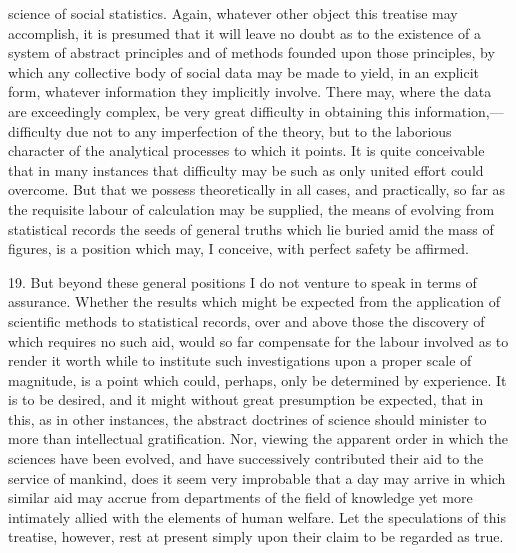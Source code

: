 \documentclass[oneside]{book}
\begin{document}
science of social statistics. Again, whatever other object this
treatise may accomplish, it is presumed that it will leave no
doubt as to the existence of a system of abstract principles and of
methods founded upon those principles, by which any collective
body of social data may be made to yield, in an explicit form,
whatever information they implicitly involve. There may, where
the data are exceedingly complex, be very great difficulty in obtaining
this information,---difficulty due not to any imperfection
of the theory, but to the laborious character of the analytical
processes to which it points. It is quite conceivable that in many
instances that difficulty may be such as only united effort could
overcome. But that we possess theoretically in all cases, and
practically, so far as the requisite labour of calculation may be
supplied, the means of evolving from statistical records the seeds
of general truths which lie buried amid the mass of figures, is a
position which may, I conceive, with perfect safety be affirmed.

19. But beyond these general positions I do not venture to
speak in terms of assurance. Whether the results which might
be expected from the application of scientific methods to statistical
records, over and above those the discovery of which requires
no such aid, would so far compensate for the labour involved
as to render it worth while to institute such investigations
upon a proper scale of magnitude, is a point which could, perhaps,
only be determined by experience. It is to be desired,
and it might without great presumption be expected, that in
this, as in other instances, the abstract doctrines of science should
minister to more than intellectual gratification. Nor, viewing
the apparent order in which the sciences have been evolved, and
have successively contributed their aid to the service of mankind,
does it seem very improbable that a day may arrive in which similar
aid may accrue from departments of the field of knowledge
yet more intimately allied with the elements of human welfare.
Let the speculations of this treatise, however, rest at present
simply upon their claim to be regarded as true.
\end{document}
